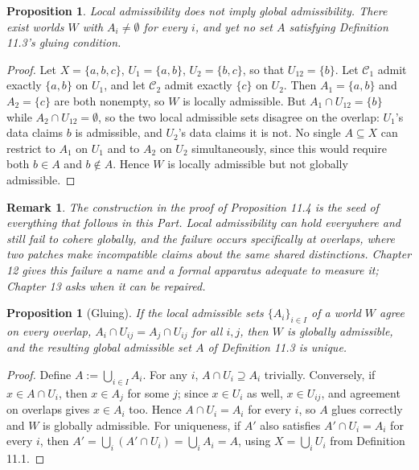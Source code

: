 \documentclass[11pt]{book}
\newtheorem{proposition}[theorem]{Proposition}
\newtheorem{remark}[theorem]{Remark}
\begin{document}
\begin{proposition}
Local admissibility does not imply global admissibility. There exist worlds $W$ with $A_i \neq \emptyset$ for every $i$, and yet no set $A$ satisfying Definition 11.3's gluing condition.
\end{proposition}

\begin{proof}
Let $X = \{a, b, c\}$, $U_1 = \{a,b\}$, $U_2 = \{b,c\}$, so that $U_{12} = \{b\}$. Let $\mathcal C_1$ admit exactly $\{a,b\}$ on $U_1$, and let $\mathcal C_2$ admit exactly $\{c\}$ on $U_2$. Then $A_1 = \{a,b\}$ and $A_2 = \{c\}$ are both nonempty, so $W$ is locally admissible. But $A_1 \cap U_{12} = \{b\}$ while $A_2 \cap U_{12} = \emptyset$, so the two local admissible sets disagree on the overlap: $U_1$'s data claims $b$ is admissible, and $U_2$'s data claims it is not. No single $A \subseteq X$ can restrict to $A_1$ on $U_1$ and to $A_2$ on $U_2$ simultaneously, since this would require both $b \in A$ and $b \notin A$. Hence $W$ is locally admissible but not globally admissible.
\end{proof}

\begin{remark}
The construction in the proof of Proposition 11.4 is the seed of everything that follows in this Part. Local admissibility can hold everywhere and still fail to cohere globally, and the failure occurs specifically at overlaps, where two patches make incompatible claims about the same shared distinctions. Chapter 12 gives this failure a name and a formal apparatus adequate to measure it; Chapter 13 asks when it can be repaired.
\end{remark}

\begin{proposition}[Gluing]
If the local admissible sets $\{A_i\}_{i \in I}$ of a world $W$ agree on every overlap, $A_i \cap U_{ij} = A_j \cap U_{ij}$ for all $i,j$, then $W$ is globally admissible, and the resulting global admissible set $A$ of Definition 11.3 is unique.
\end{proposition}

\begin{proof}
Define $A := \bigcup_{i \in I} A_i$. For any $i$, $A \cap U_i \supseteq A_i$ trivially. Conversely, if $x \in A \cap U_i$, then $x \in A_j$ for some $j$; since $x \in U_i$ as well, $x \in U_{ij}$, and agreement on overlaps gives $x \in A_i$ too. Hence $A \cap U_i = A_i$ for every $i$, so $A$ glues correctly and $W$ is globally admissible. For uniqueness, if $A'$ also satisfies $A' \cap U_i = A_i$ for every $i$, then $A' = \bigcup_i (A' \cap U_i) = \bigcup_i A_i = A$, using $X = \bigcup_i U_i$ from Definition 11.1.
\end{proof}
\end{document}

